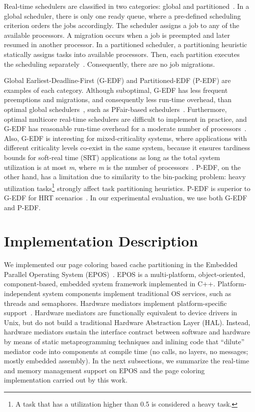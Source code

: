 \documentclass[10pt, conference, compsocconf]{IEEEtran}
\begin{document}
Real-time schedulers are classified in two categories: global and partitioned~\cite{Carpenter2004}. In a global scheduler, there is only one ready queue, where a pre-defined scheduling criterion orders the jobs accordingly. The scheduler assigns a job to any of the available processors. A migration occurs when a job is preempted and later resumed in another processor. In a partitioned scheduler, a partitioning heuristic statically assigns tasks into available processors. Then, each partition executes the scheduling separately~\cite{Liu:2000}. Consequently, there are no job migrations.

Global Earliest-Deadline-First (G-EDF) and Partitioned-EDF (P-EDF) are examples of each category. Although suboptimal, G-EDF has less frequent preemptions and migrations, and consequently less run-time overhead, than optimal global schedulers~\cite{Brandenburg:2008}, such as PFair-based schedulers~\cite{Baruah96,Levin:2010}. Furthermore, optimal multicore real-time schedulers are difficult to implement in practice, and G-EDF has reasonable run-time overhead for a moderate number of processors~\cite{Bastoni:2010}. Also, G-EDF is interesting for mixed-criticality systems, where applications with different criticality levels co-exist in the same system, because it ensures tardiness bounds for soft-real time (SRT) applications as long as the total system utilization is at most \textit{m}, where \textit{m} is the number of processors~\cite{Leontyev:2007}. P-EDF, on the other hand, has a limitation due to similarity to the bin-packing problem: heavy utilization tasks\footnote{A task that has a utilization higher than 0.5 is considered a heavy task.} strongly affect task partitioning heuristics. P-EDF is superior to G-EDF for HRT scenarios~\cite{Gracioli:2013}. In our experimental evaluation, we use both G-EDF and P-EDF.

\section{Implementation Description}
\label{sec:imp}

We implemented our page coloring based cache partitioning in the Embedded Parallel Operating System (EPOS)~\cite{Froehlich:2001,epos}. EPOS is a multi-platform, object-oriented, component-based, embedded system framework implemented in C++. Platform-independent system components implement traditional OS services, such as threads and semaphores. Hardware mediators implement platform-specific support~\cite{Polpeta2004}. Hardware mediators are functionally equivalent to device drivers in Unix, but do not build a traditional Hardware Abstraction Layer (HAL). Instead, hardware mediators sustain the interface contract between software and hardware by means of static metaprogramming techniques and inlining code that ``dilute'' mediator code into components at compile time (no calls, no layers, no messages; mostly embedded assembly). In the next subsections, we summarize the real-time and memory management support on EPOS and the page coloring implementation carried out by this work.
\end{document}
